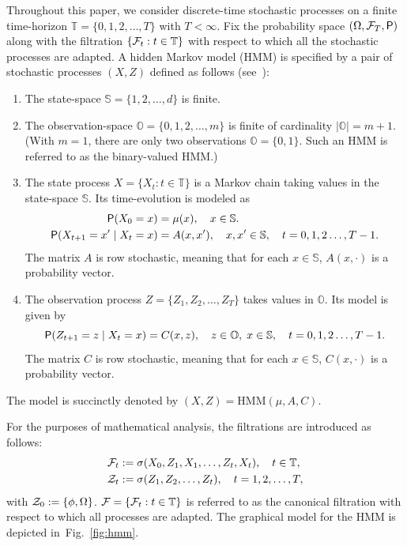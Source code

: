 \documentclass[twoside,11pt]{article}
\def\Fig#1{Fig.~\ref{#1}}
\def\clZ{{\cal Z}}
\def\Fig#1{Fig.~\ref{#1}}
\def\clZ{{\cal Z}}
\def\bS{\begin{slide}}
\def\clZ{{\cal Z}}
\def\clF{{\cal F}}
\def\clZ{{\cal Z}}
\def\bS{\mathbb{S}}
\def\bO{\mathbb{O}}
\def\sP{{\sf P}}
\begin{document}
Throughout this paper, we consider discrete-time stochastic processes on a finite time-horizon $\mathbb{T}=\{0,1,2,\hdots,T\}$ with $T<\infty$. 
Fix the probability space $(\Omega,\clF_T,\sP)$ along with the filtration $\{\clF_t:t\in\mathbb{T}\}$ with respect to which all the stochastic processes are adapted.
A hidden Markov model (HMM) is specified by a pair of stochastic processes $(X,Z)$ defined as follows (see~\cite{elliott2008hidden,Moulines2006inference}): 
\begin{enumerate}
  \item The {state-space} $\bS=\{1,2,\hdots,d\}$ is finite.
  
  \item The {observation-space} $\bO=\{0,1,2,\hdots,m\}$ is finite of cardinality $|\bO|=m+1$. 
  (With $m=1$, there are only two observations $\bO=\{0,1\}$.
  Such an HMM is referred to as the binary-valued HMM.)
  
  \item The state process $X=\{X_t:t\in\mathbb{T}\}$ is a Markov chain taking values in the state-space $\bS$.  
  Its time-evolution is modeled as
  \begin{align*}
    \sP(X_0=x)  &= \mu(x), \quad x\in\bS. \\
    \sP(X_{t+1} =x' \mid X_t=x) &= A(x,x'), \quad x,x'\in\bS,\quad t=0,1,2\hdots,T-1.
  \end{align*}
  The matrix $A$ is row stochastic, meaning that for each $x\in\bS$, $A(x,\cdot)$ is a probability vector.
  
  \item The  observation process $Z=\{Z_1,Z_2,\hdots,Z_T\}$ takes values in $\bO$. Its model is given by
  \begin{equation*}
    \sP(Z_{t+1} = z \mid X_t=x) = C(x,z),\quad z\in\bO,\;x\in\bS, \quad t=0,1,2\hdots,T-1.
  \end{equation*}
  The matrix $C$ is row stochastic, meaning that for each $x\in\bS$, $C(x,\cdot)$ is a probability vector.
\end{enumerate}
The model is succinctly denoted by $(X,Z)=\text{HMM}(\mu,A,C)$. 

For the purposes of mathematical analysis, the filtrations are
introduced as follows:
  \begin{align*}
    \clF_t&:=\sigma(X_0,Z_1,X_1,\hdots,Z_t,X_t),\quad t\in\mathbb{T},\\
    \clZ_t&:=\sigma(Z_1,Z_2,\hdots,Z_t), \quad t=1,2,\hdots, T,
  \end{align*}
  with $\clZ_0:=\{\phi,\Omega\}$. $\clF=\{\clF_t:t\in\mathbb{T}\}$ is referred
  to as the canonical filtration with respect to which all processes
  are adapted.  The graphical model for the HMM is depicted 
  in~\Fig{fig:hmm}.  
\end{document}
